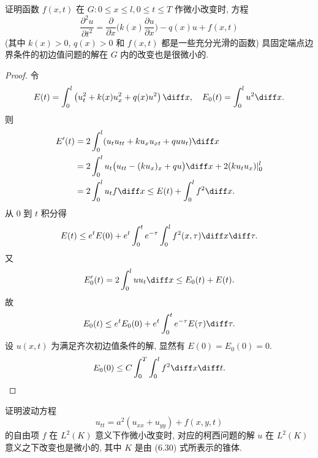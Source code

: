 \begin{exercise}
  证明函数 $f(x,t)$ 在 $G\colon 0\leq x\leq l, 0\leq t\leq T$ 作微小改变时, 方程
  \[\frac{\partial^2 u}{\partial t^2}
    = \frac{\partial}{\partial x}\biggl(k(x)\frac{\partial u}{\partial x}\biggr)
      -q(x)u + f(x,t)\]
  (其中 $k(x)>0$, $q(x)>0$ 和 $f(x,t)$ 都是一些充分光滑的函数)
  具固定端点边界条件的初边值问题的解在 $G$ 内的改变也是很微小的.
\end{exercise}

\begin{proof}
  令
  \[E(t)=\int_0^l\left(u_t^2+k(x)u_x^2+q(x)u^2\right)\diff x,
    \quad E_0(t)=\int_0^lu^2\diff x.\]
  则
  \[\begin{split}
    E'(t)
    & = 2\int_0^l(u_tu_{tt}+ku_xu_{xt}+quu_t)\diff x \\
    & = 2\int_0^lu_t\bigl(u_{tt}-(ku_x)_x+qu\bigr)\diff x+2(ku_tu_x)|_0^l \\
    & = 2\int_0^lu_tf\diff x\leq E(t)+\int_0^lf^2\diff x.
  \end{split}\]
  从 $0$ 到 $t$ 积分得
  \[E(t)\leq e^tE(0)+e^t\int_0^te^{-\tau}\int_0^lf^2(x,\tau)\diff x\diff\tau.\]
  又
  \[E'_0(t) = 2\int_0^l uu_t \diff x\leq E_0(t) + E(t).\]
  故
  \[E_0(t)\leq e^t E_0(0) + e^t\int_0^t e^{-\tau} E(\tau) \diff\tau.\]
  设 $u(x,t)$ 为满足齐次初边值条件的解, 显然有 $E(0)=E_0(0)=0$.
  \[E_0(0) \leq C\int_0^T \int_0^l f^2 \diff x\diff t.\qedhere\]
\end{proof}


\begin{exercise}
  证明波动方程
  \[u_{tt} = a^2(u_{xx}+u_{yy}) + f(x,y,t)\]
  的自由项 $f$ 在 $L^2(K)$ 意义下作微小改变时, 对应的柯西问题的解 $u$ 在
  $L^2(K)$ 意义之下改变也是微小的, 其中 $K$ 是由 (6.30) 式所表示的锥体.
\end{exercise}

